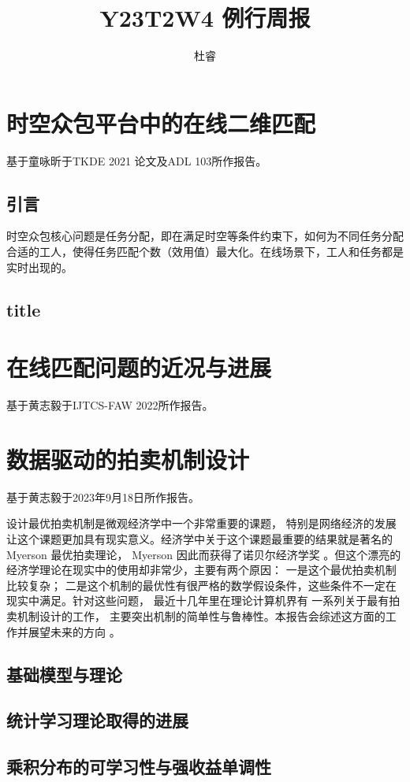 \documentclass[a4paper,10pt]{ctexart}
\title{Y23T2W4 例行周报}
\author{杜睿}
\begin{document}
\tableofcontents
\maketitle


\section{时空众包平台中的在线二维匹配}

基于童咏昕于TKDE 2021 论文及ADL 103所作报告。

\subsection{引言}

时空众包核心问题是任务分配，即在满足时空等条件约束下，如何为不同任务分配合适的工人，使得任务匹配个数（效用值）最大化。在线场景下，工人和任务都是实时出现的。

\subsection{title}

\section{在线匹配问题的近况与进展}

基于黄志毅于IJTCS-FAW 2022所作报告。


\section{数据驱动的拍卖机制设计}

基于黄志毅于2023年9月18日所作报告。

设计最优拍卖机制是微观经济学中一个非常重要的课题， 特别是网络经济的发展让这个课题更加具有现实意义。经济学中关于这个课题最重要的结果就是著名的Myerson 最优拍卖理论， Myerson 因此而获得了诺贝尔经济学奖 。但这个漂亮的经济学理论在现实中的使用却非常少，主要有两个原因： 一是这个最优拍卖机制比较复杂； 二是这个机制的最优性有很严格的数学假设条件，这些条件不一定在现实中满足。针对这些问题， 最近十几年里在理论计算机界有 一系列关于最有拍卖机制设计的工作， 主要突出机制的简单性与鲁棒性。本报告会综述这方面的工作并展望未来的方向 。

\subsection{基础模型与理论}

\subsection{统计学习理论取得的进展}

\subsection{乘积分布的可学习性与强收益单调性}
\end{document}
